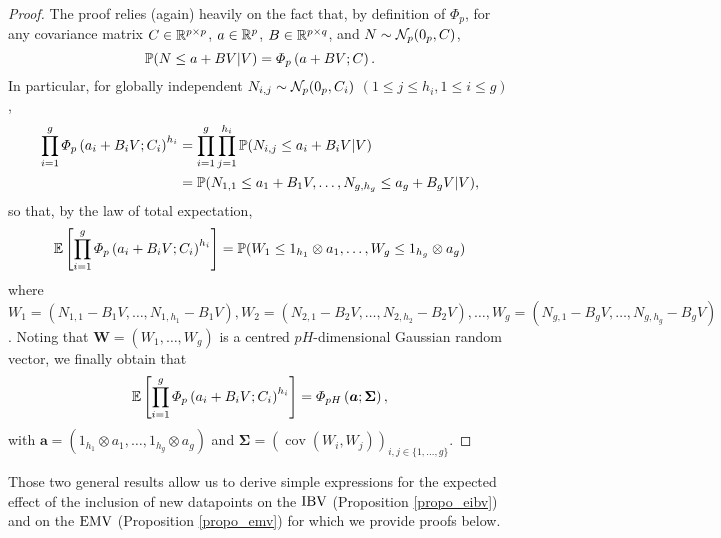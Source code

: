 \begin{proof}
    The proof relies (again) heavily on the fact that, by definition of $\Phi_{p}$, for any covariance matrix $C \in \mathbb{R}^{p \times p}$, $a\in \mathbb{R}^p$, $B\in \mathbb{R}^{p \times q}$, and $N\sim \mathcal{N}_{p}(0_{p},C)$,
    $$
    \mathbb{P}(N\leq a + BV | V)
    =
    \varPhi_{p}\left( a + BV; C \right).
    $$
In particular, for globally independent $N_{i,j} \sim \mathcal{N}_{p}(0_{p},C_i)$ $(1\leq j \leq h_i, 1\leq i \leq g)$,
\begin{equation*}
\begin{split}
\prod_{i=1}^{g} \varPhi_{p}\left(a_i + B_{i}V; \covN_{i} \right)^{h_i}
&=
\prod_{i=1}^{g}
\prod_{j=1}^{h_{i}}
\mathbb{P}(N_{i,j}\leq a_i + B_i V | V)\\
&=\mathbb{P}(N_{1,1}\leq a_1 + B_1 V, \dots, N_{g,h_{g}}\leq a_g + B_g V | V),
\end{split} 
\end{equation*}
so that, by the law of total expectation,
    \begin{equation*}
    \begin{split}
    \mathbb{E}\left[ \prod_{i=1}^{g} \varPhi_{p}\left(a_i + B_{i}V; \covN_{i} \right)^{h_i} \right]
=
\mathbb{P}(W_{1} \leq 1_{h_{1}} \otimes a_1, \dots, W_{g} \leq 1_{h_{g}} \otimes a_g)
    \end{split}
    \end{equation*}
where
$W_{1}=(N_{1,1}- B_1 V, \dots, N_{1,h_{1}}- B_1 V), 
W_{2}=(N_{2,1}- B_2 V, \dots, N_{2,h_{2}}- B_2 V), 
\dots, W_{g}=(N_{g,1}- B_g V, \dots, N_{g,h_{g}}- B_g V)$. Noting that $\mathbf{W}=(W_1,\dots, W_g)$ is a centred $p H$-dimensional Gaussian random vector, we finally obtain that
    \begin{equation*}
\begin{split}
\mathbb{E}\left[ \prod_{i=1}^{g} \varPhi_{p}\left(a_i + B_{i}V; \covN_{i} \right)^{h_i} \right]
=
\varPhi_{p H}\left(\bm{a};\mathbf{\Sigma}\right),
    \end{split}
\end{equation*}
with $\bm{a}=(1_{h_{1}} \otimes a_1, \dots, 1_{h_{g}} \otimes a_g)$ and $\bm{\Sigma}=(\operatorname{cov}(W_i,W_j))_{i,j \in \{1,\dots, g\}}$.
\end{proof}

Those two general results allow us to derive simple expressions for the expected effect of the inclusion of new datapoints on the $\mathrm{IBV}$ (Proposition \ref{propo_eibv}) and on the $\mathrm{EMV}$ (Proposition \ref{propo_emv}) for which we provide proofs below.


